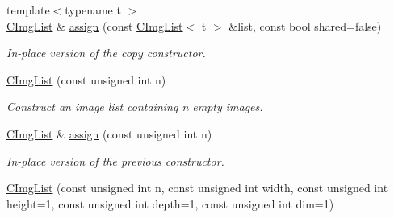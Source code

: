 \begin{DoxyCompactItemize}
\item 
\hypertarget{structcimg__library_1_1_c_img_list_abd4a749d3480e94b97ea11c99648b68a}{
{\footnotesize template$<$typename t $>$ }\\\hyperlink{structcimg__library_1_1_c_img_list}{CImgList} \& \hyperlink{structcimg__library_1_1_c_img_list_abd4a749d3480e94b97ea11c99648b68a}{assign} (const \hyperlink{structcimg__library_1_1_c_img_list}{CImgList}$<$ t $>$ \&list, const bool shared=false)}
\label{structcimg__library_1_1_c_img_list_abd4a749d3480e94b97ea11c99648b68a}

\begin{DoxyCompactList}\small\item\em In-\/place version of the copy constructor. \item\end{DoxyCompactList}\item 
\hypertarget{structcimg__library_1_1_c_img_list_a0f9c6c3ea20c2bb5c1efa312a718072e}{
\hyperlink{structcimg__library_1_1_c_img_list_a0f9c6c3ea20c2bb5c1efa312a718072e}{CImgList} (const unsigned int n)}
\label{structcimg__library_1_1_c_img_list_a0f9c6c3ea20c2bb5c1efa312a718072e}

\begin{DoxyCompactList}\small\item\em Construct an image list containing n empty images. \item\end{DoxyCompactList}\item 
\hypertarget{structcimg__library_1_1_c_img_list_a0f24623df6ce55cc7eff19abf90b7131}{
\hyperlink{structcimg__library_1_1_c_img_list}{CImgList} \& \hyperlink{structcimg__library_1_1_c_img_list_a0f24623df6ce55cc7eff19abf90b7131}{assign} (const unsigned int n)}
\label{structcimg__library_1_1_c_img_list_a0f24623df6ce55cc7eff19abf90b7131}

\begin{DoxyCompactList}\small\item\em In-\/place version of the previous constructor. \item\end{DoxyCompactList}\item 
\hypertarget{structcimg__library_1_1_c_img_list_a980a7f9e82d73959a1b2f06241d86171}{
\hyperlink{structcimg__library_1_1_c_img_list_a980a7f9e82d73959a1b2f06241d86171}{CImgList} (const unsigned int n, const unsigned int width, const unsigned int height=1, const unsigned int depth=1, const unsigned int dim=1)}
\label{structcimg__library_1_1_c_img_list_a980a7f9e82d73959a1b2f06241d86171}


\end{DoxyCompactItemize}
